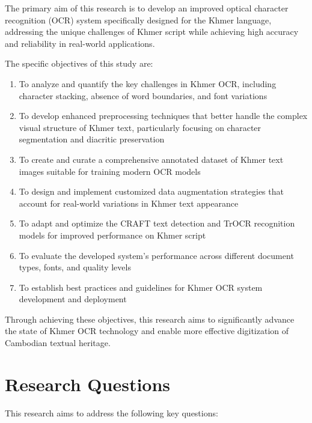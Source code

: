The primary aim of this research is to develop an improved optical character recognition (OCR) system specifically designed for the Khmer language, addressing the unique challenges of Khmer script while achieving high accuracy and reliability in real-world applications.

The specific objectives of this study are:

\begin{enumerate}
    \item To analyze and quantify the key challenges in Khmer OCR, including character stacking, absence of word boundaries, and font variations
    
    \item To develop enhanced preprocessing techniques that better handle the complex visual structure of Khmer text, particularly focusing on character segmentation and diacritic preservation
    
    \item To create and curate a comprehensive annotated dataset of Khmer text images suitable for training modern OCR models
    
    \item To design and implement customized data augmentation strategies that account for real-world variations in Khmer text appearance
    
    \item To adapt and optimize the CRAFT text detection and TrOCR recognition models for improved performance on Khmer script
    
    \item To evaluate the developed system's performance across different document types, fonts, and quality levels
    
    \item To establish best practices and guidelines for Khmer OCR system development and deployment
\end{enumerate}

Through achieving these objectives, this research aims to significantly advance the state of Khmer OCR technology and enable more effective digitization of Cambodian textual heritage.

\section{Research Questions}
\label{sec:questions}

This research aims to address the following key questions:

